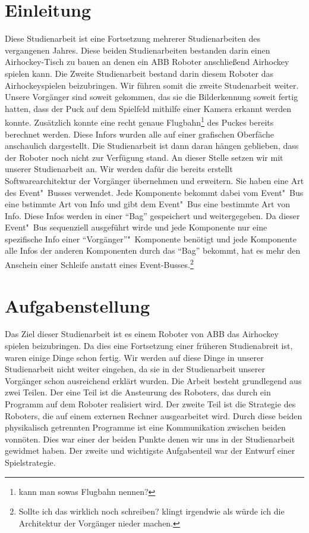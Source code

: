
\chapter{Einleitung}
Diese Studienarbeit ist eine Fortsetzung mehrerer Studienarbeiten des vergangenen Jahres. Diese beiden Studienarbeiten bestanden darin einen Airhockey-Tisch zu bauen an denen ein ABB Roboter anschließend Airhockey spielen kann. Die Zweite Studienarbeit bestand darin diesem Roboter das Airhockeyspielen beizubringen. Wir führen somit die zweite Studenarbeit weiter. Unsere Vorgänger sind soweit gekommen, das sie die Bilderkennung soweit fertig hatten, dass der Puck auf dem Spielfeld mithilfe einer Kamera erkannt werden konnte. Zusätzlich konnte eine recht genaue Flugbahn\footnote{kann man sowas Flugbahn nennen?} des Puckes bereits berechnet werden. Diese Infors wurden alle auf einer grafischen Oberfäche anschaulich dargestellt. Die Studienarbeit ist dann daran hängen geblieben, dass der Roboter noch nicht zur Verfügung stand. An dieser Stelle setzen wir mit unserer Studienarbeit an. Wir werden dafür die bereits erstellt Softwarearchitektur der Vorgänger übernehmen und erweitern. Sie haben eine Art des Event"~Busses verwendet. Jede Komponente bekommt dabei vom Event"~Bus eine bstimmte Art von Info und gibt dem Event"~Bus eine bestimmte Art von Info. Diese Infos werden in einer \enquote{Bag} gespeichert und weitergegeben. Da dieser Event"~Bus sequenziell ausgeführt wirde und jede Komponente nur eine spezifische Info einer \enquote{Vorgänger}"~Komponente benötigt und jede Komponente alle Infos der anderen Komponenten durch das \enquote{Bag} bekommt, hat es mehr den Anschein einer Schleife anstatt eines Event-Busses.\footnote{Sollte ich das wirklich noch schreiben? klingt irgendwie als würde ich die Architektur der Vorgänger nieder machen.}

\newpage

\chapter{Aufgabenstellung}
Das Ziel dieser Studienarbeit ist es einem Roboter von ABB das Airhockey spielen beizubringen. Da dies eine Fortsetzung einer früheren Studienabreit ist, waren einige Dinge schon fertig. Wir werden auf diese Dinge in unserer Studienarbeit nicht weiter eingehen, da sie in der Studienarbeit unserer Vorgänger schon ausreichend erklärt wurden. Die Arbeit besteht grundlegend aus zwei Teilen. Der eine Teil ist die Ansteurung des Roboters, das durch ein Programm auf dem Roboter realisiert wird. Der zweite Teil ist die Strategie des Roboters, die auf einem externen Rechner ausgearbeitet wird.
Durch diese beiden physikalisch getrennten Programme ist eine Kommunikation zwischen beiden vonnöten. Dies war einer der beiden Punkte denen wir uns in der Studienarbeit gewidmet haben. Der zweite und wichtigste Aufgabenteil war der Entwurf einer Spielstrategie. 

